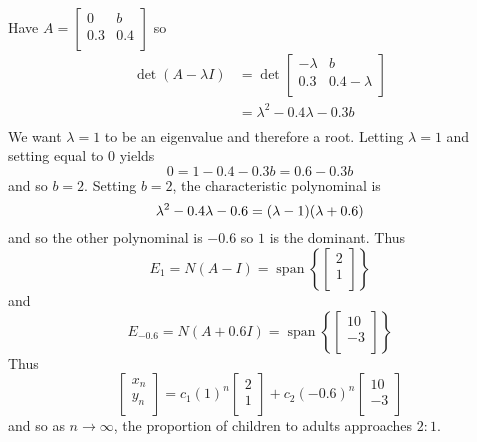 \documentclass{article}
\DeclareMathOperator{\spn}{span}
\begin{document}
\begin{example}
  Have $A =
    \begin{bmatrix}
      0   & b   \\
      0.3 & 0.4 \\
    \end{bmatrix}$ so
  \begin{align*}
    \det (A - \lambda I) & = \det
    \begin{bmatrix}
      -\lambda & b           \\
      0.3      & 0.4-\lambda \\
    \end{bmatrix}                                \\
                         & = \lambda^2 - 0.4\lambda -0.3b \\
  \end{align*}
  We want $\lambda = 1$ to be an eigenvalue and therefore a root. Letting $\lambda = 1$ and setting equal to $0$ yields \[
    0 = 1 - 0.4 - 0.3b = 0.6 - 0.3b
  \] and so $b = 2$. Setting $b = 2$, the characteristic polynominal is \[
    \lambda^2 - 0.4\lambda - 0.6 = (\lambda - 1)(\lambda + 0.6)\\
  \] and so the other polynominal is $-0.6$ so $1$ is the dominant. Thus \[
    E_1 = N(A - I) = \spn \left\{
    \begin{bmatrix}
      2 \\1\\
    \end{bmatrix}\right\}
  \] and \[
    E_{-0.6} = N(A + 0.6I) = \spn\left\{
    \begin{bmatrix}
      10 \\-3\\
    \end{bmatrix}\right\}
  \]
  Thus \[
    \begin{bmatrix}
      x_n \\y_n\\
    \end{bmatrix} = c_1(1)^n
    \begin{bmatrix}
      2 \\1\\
    \end{bmatrix} + c_2(-0.6)^n
    \begin{bmatrix}
      10 \\-3\\
    \end{bmatrix}
  \] and so as $n \to \infty$, the proportion of children to adults approaches $2:1$.
\end{example}
\end{document}
